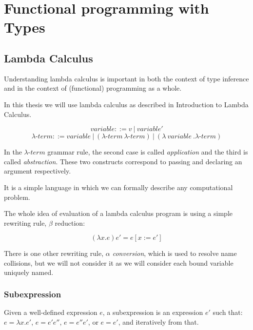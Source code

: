 \chapter{Functional programming with Types}

\section{Lambda Calculus}

Understanding lambda calculus is important in both the context of type inference and in the context of (functional) programming as a whole.

In this thesis we will use lambda calculus as described in Introduction to Lambda Calculus.  %


\begin{defn}
$$variable ::= v\ |\ variable'$$
$$\lambda\mbox{-}term ::= variable\ |\ (\lambda\mbox{-}term\ \lambda\mbox{-}term)\ |\ (\lambda\ variable\ . \lambda\mbox{-}term )$$
\end{defn}

In the $\lambda\mbox{-}term$ grammar rule, the second case is called \emph{application} and the third is called \emph{abstraction}. These two constructs correspond to passing and declaring an argument respectively.

It is a simple language in which we can formally describe any computational problem.

The whole idea of evaluation of a lambda calculus program is using a simple rewriting rule, $\beta$ reduction:

\begin{defn}
    $$(\lambda x . e) e' = e [x := e']$$ %
\end{defn}

There is one other rewriting rule, \emph{$\alpha$ conversion}, which is used to resolve name collisions, but we will not consider it as we will consider each bound variable uniquely named.

\subsection{Subexpression}

\begin{defn}[Subexpression]
Given a well-defined expression $e$, a subexpression is an expression $e'$ such that: $e = \lambda x . e'$, $e = e' e''$, $e = e'' e'$, or $e = e'$, and iteratively from that.
\end{defn}


